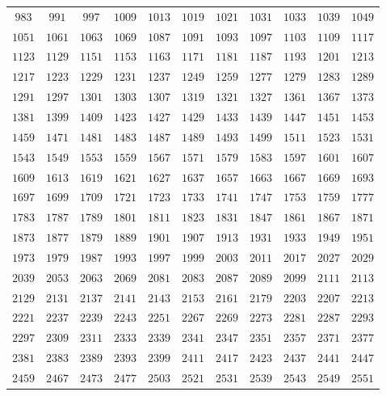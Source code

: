 \begin{table}[h!]
{\begin{tabular}{|c|c|c|c|c|c|c|c|c|c|c|}
$983 $ & $991 $ & $997 $ & $1009$ & $1013$ & $1019$ & $1021$ & $1031$ & $1033$ & $1039$ & $1049$ \\
$1051$ & $1061$ & $1063$ & $1069$ & $1087$ & $1091$ & $1093$ & $1097$ & $1103$ & $1109$ & $1117$ \\
$1123$ & $1129$ & $1151$ & $1153$ & $1163$ & $1171$ & $1181$ & $1187$ & $1193$ & $1201$ & $1213$ \\
$1217$ & $1223$ & $1229$ & $1231$ & $1237$ & $1249$ & $1259$ & $1277$ & $1279$ & $1283$ & $1289$ \\
$1291$ & $1297$ & $1301$ & $1303$ & $1307$ & $1319$ & $1321$ & $1327$ & $1361$ & $1367$ & $1373$ \\
$1381$ & $1399$ & $1409$ & $1423$ & $1427$ & $1429$ & $1433$ & $1439$ & $1447$ & $1451$ & $1453$ \\
$1459$ & $1471$ & $1481$ & $1483$ & $1487$ & $1489$ & $1493$ & $1499$ & $1511$ & $1523$ & $1531$ \\
$1543$ & $1549$ & $1553$ & $1559$ & $1567$ & $1571$ & $1579$ & $1583$ & $1597$ & $1601$ & $1607$ \\
$1609$ & $1613$ & $1619$ & $1621$ & $1627$ & $1637$ & $1657$ & $1663$ & $1667$ & $1669$ & $1693$ \\
$1697$ & $1699$ & $1709$ & $1721$ & $1723$ & $1733$ & $1741$ & $1747$ & $1753$ & $1759$ & $1777$ \\
$1783$ & $1787$ & $1789$ & $1801$ & $1811$ & $1823$ & $1831$ & $1847$ & $1861$ & $1867$ & $1871$ \\
$1873$ & $1877$ & $1879$ & $1889$ & $1901$ & $1907$ & $1913$ & $1931$ & $1933$ & $1949$ & $1951$ \\
$1973$ & $1979$ & $1987$ & $1993$ & $1997$ & $1999$ & $2003$ & $2011$ & $2017$ & $2027$ & $2029$ \\
$2039$ & $2053$ & $2063$ & $2069$ & $2081$ & $2083$ & $2087$ & $2089$ & $2099$ & $2111$ & $2113$ \\
$2129$ & $2131$ & $2137$ & $2141$ & $2143$ & $2153$ & $2161$ & $2179$ & $2203$ & $2207$ & $2213$ \\
$2221$ & $2237$ & $2239$ & $2243$ & $2251$ & $2267$ & $2269$ & $2273$ & $2281$ & $2287$ & $2293$ \\
$2297$ & $2309$ & $2311$ & $2333$ & $2339$ & $2341$ & $2347$ & $2351$ & $2357$ & $2371$ & $2377$ \\
$2381$ & $2383$ & $2389$ & $2393$ & $2399$ & $2411$ & $2417$ & $2423$ & $2437$ & $2441$ & $2447$ \\
$2459$ & $2467$ & $2473$ & $2477$ & $2503$ & $2521$ & $2531$ & $2539$ & $2543$ & $2549$ & $2551$ \\

\end{tabular}}
\end{table}
